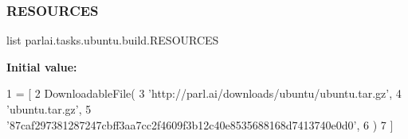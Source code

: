 \subsubsection{\texorpdfstring{R\+E\+S\+O\+U\+R\+C\+ES}{RESOURCES}}
{\footnotesize\ttfamily list parlai.\+tasks.\+ubuntu.\+build.\+R\+E\+S\+O\+U\+R\+C\+ES}

{\bfseries Initial value\+:}
\begin{DoxyCode}
1 =  [
2     DownloadableFile(
3         \textcolor{stringliteral}{'http://parl.ai/downloads/ubuntu/ubuntu.tar.gz'},
4         \textcolor{stringliteral}{'ubuntu.tar.gz'},
5         \textcolor{stringliteral}{'87caf297381287247cbff3aa7cc2f4609f3b12c40e8535688168d7413740e0d0'},
6     )
7 ]
\end{DoxyCode}
